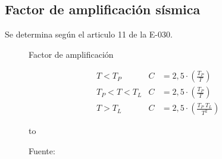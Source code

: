 \subsection{Factor de amplificación sísmica}
Se determina según el articulo 11 de la E-030.
\newpage
\setlength{\jot}{0.5cm}%
\begin{figure}[h!]
    \centering
    \begin{minipage}{0.5\textwidth}
    \vspace{-4cm}
    \caption{Factor de amplificación}
        \begin{align*}
        &T< T_{P}         &   C&=2,5\cdot\left ( \frac{T_{P}}{T} \right )\\
        &T_{P}< T< T_{L}  &   C&=2,5\cdot\left ( \frac{T_{P}}{T} \right )\\
        &T> T_{L}         &   C&=2,5\cdot\left ( \frac{T_{P}\;T_{L}}{T^{2}} \right )
        \end{align*}
    \end{minipage}
    \begin{minipage}{0.4\textwidth}
    \vspace{-3cm}
        \centering
        \vbox to \ht{}
    \end{minipage}
    \vspace{-3.4cm}
    \caption*{\small Fuente: \it \cite{comen}}
  \label{fac}
\end{figure}
\vspace{-0.8cm}
